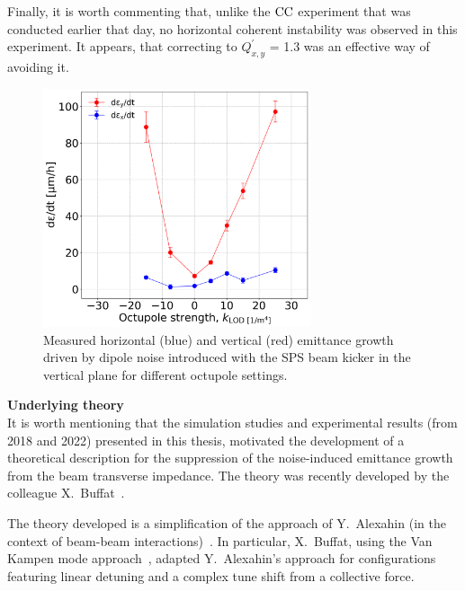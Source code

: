 Finally, it is worth commenting that, unlike the ${\mathrm{CC}}$ experiment that was conducted earlier that day, no horizontal coherent instability was observed in this experiment. It appears, that correcting to $Q^\prime_{x,y}$ = 1.3 was an effective way of avoiding it.
  

\begin{figure}[!h]
   \centering         
   \includegraphics[width=0.7\textwidth]{images/Ch8/emitGrowth_H_V_dipole_noise_damper_md_measurements.png}
       \caption{Measured horizontal (blue) and vertical (red) emittance growth driven by dipole noise introduced with the SPS beam kicker in the vertical plane for different octupole settings.}
       \label{fig:coast_dipole_noise_damper_md_2022_measurement}
\end{figure}

\textbf{Underlying theory}\\
It is worth mentioning that the simulation studies and experimental results (from 2018 and 2022) presented in this thesis, motivated the development of a theoretical description for the suppression of the noise-induced emittance growth from the beam transverse impedance. The theory was recently developed by the colleague X.~Buffat~\cite{Buffat:2022dac, van_kamper_presentation_xavier_theory}. 

The theory developed is a simplification of the approach of Y.~Alexahin (in the context of beam-beam interactions)~\cite{Alexahin:485304}. In particular, X.~Buffat, using the Van Kampen mode approach~\cite{VANKAMPEN1955949}, adapted Y.~Alexahin's approach for configurations featuring linear detuning and a complex tune shift from a collective force. 


